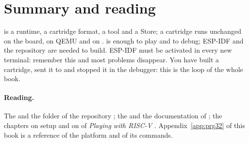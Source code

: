 \section{Summary and reading}

\prg is a runtime, a cartridge format, a tool and a Store; a cartridge runs
unchanged on the board, on QEMU and on \prgqt. \prgqt is enough to play and to
debug; ESP-IDF and the \prg repository are needed to build. ESP-IDF must be
activated in every new terminal: remember this and most problems disappear.
You have built a cartridge, sent it to \prgqt and stopped it in the debugger:
this is the loop of the whole book.

\paragraph{Reading.} The  and the folder  of
the \prg repository \citep{prg32repo}; the  and the
documentation of \prgqt \citep{prg32qt}; the chapters on setup and on \prgqt
of \emph{Playing with RISC-V} \citep{prg32textbook}. Appendix~\ref{app:prg32}
of this book is a reference of the platform and of its commands.
